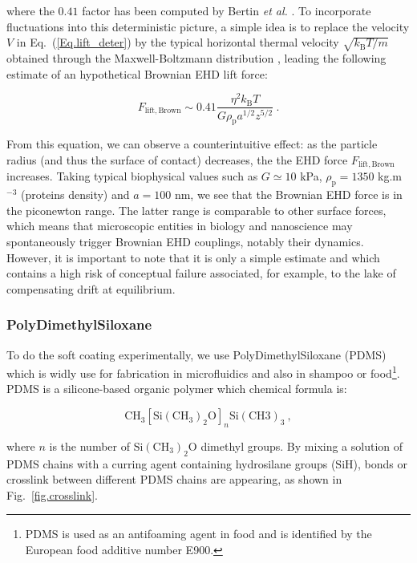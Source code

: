  where the $0.41$ factor has been computed by Bertin \textit{et al.} \cite{bertin_soft-lubrication_2021}. To incorporate fluctuations into this deterministic picture, a simple idea is to replace the velocity $V$ in Eq.~(\ref{Eq.lift_deter}) by the typical horizontal thermal velocity $\sqrt{k_\mathrm{B}T / m}$ obtained through the Maxwell-Boltzmann distribution , leading the following estimate of an hypothetical Brownian \gls{EHD} lift force:

\begin{equation}
	F_\mathrm{lift, Brown} \sim 0.41\frac{\eta ^2 k_\mathrm{B}T}{G\rho_\mathrm{p} a^{1/2} z^{5/2}} ~.
	\label{Eq.lift_brown}
\end{equation}


From this equation, we can observe a counterintuitive effect: as the particle radius (and thus the surface of contact) decreases, the the \gls{EHD} force $F_\mathrm{lift, Brown}$ increases. Taking typical biophysical values such as $G \simeq 10$ kPa, $\rho_\mathrm{p} = 1350$ kg.m$^{-3}$ (proteins density) and $a=100$ nm, we see that the Brownian \gls{EHD} force is in the piconewton range. The latter range is comparable to other surface forces, which means that microscopic entities in biology and nanoscience may spontaneously trigger Brownian \gls{EHD} couplings, notably their dynamics. However, it is important to note that it is only a simple estimate and which contains a high risk of conceptual failure associated, for example, to the lake of compensating drift at equilibrium. 

\subsubsection{PolyDimethylSiloxane}
To do the soft coating experimentally, we use PolyDimethylSiloxane (\gls{PDMS}) which is widly use for fabrication in microfluidics and also in shampoo \cite{im_shampoo_2012} or food\footnote{ \gls{PDMS} is used as an antifoaming agent in food and is identified by the European food additive number E900.}. \gls{PDMS} is a silicone-based organic polymer which chemical formula is:

\begin{equation}
	\mathrm{CH_3[Si(CH_3)_2 O]}_n \mathrm{Si(CH3)_3} ~,
\end{equation}

where $n$ is the number of $\mathrm{Si(CH_3)_2 O}$ dimethyl groups. By mixing a solution of \gls{PDMS} chains with a curring agent containing hydrosilane groups ($\mathrm{SiH}$), bonds or crosslink between different \gls{PDMS} chains are appearing, as shown in Fig.~\ref{fig.crosslink}.




